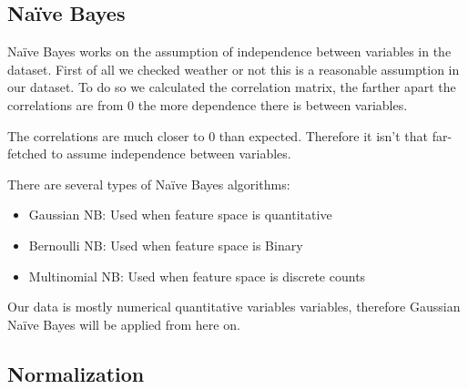
\subsection{Na\"ive Bayes}%
\label{sub:naive-bayes}

\newcommand{\sresults}[5]{
\begin{table}[H]
\centering
\begin{tabular}{lc}
Confusion matrix on test set: & \( \begin{bmatrix} #1 \end{bmatrix} \) \\
    \addlinespace[0.5em]
    Accuracy on test set: & #2
\end{tabular}
\end{table}
}


Na\"ive Bayes works on the assumption of independence between variables in the dataset. First of all we checked weather or not this is a reasonable assumption in our dataset. To do so we calculated the correlation matrix, the farther apart the correlations are from 0 the more dependence there is between variables.


The correlations are much closer to 0 than expected. Therefore it isn't that far-fetched to assume independence
between variables.

There are several types of Na\"ive Bayes algorithms:
\begin{itemize}[topsep=0pt]
    \item Gaussian NB: Used when feature space is quantitative
    \item Bernoulli NB: Used when feature space is Binary
    \item Multinomial NB: Used when feature space is discrete counts
\end{itemize}

Our data is mostly numerical quantitative variables variables, therefore Gaussian Na\"ive Bayes will be applied from here on.

\subsection{Normalization}

